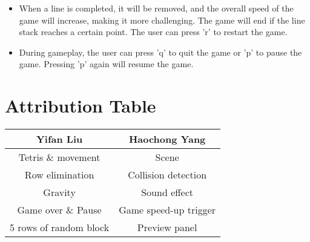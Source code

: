 \documentclass{article}
\begin{document}
\begin{enumerate}
\begin{itemize}
\item When a line is completed, it will be removed, and the overall speed of the game will increase, making it more challenging. The game will end if the line stack reaches a certain point. The user can press 'r' to restart the game.

\item During gameplay, the user can press 'q' to quit the game or 'p' to pause the game. Pressing 'p' again will resume the game.
\end{itemize}

    
\end{enumerate}

\section{Attribution Table}

\begin{center}
\begin{tabular}{|| c | c ||}
\hline
 Yifan Liu &  Haochong Yang \\ 
 \hline
 Tetris \& movement & Scene\\
 \hline
 Row elimination & Collision detection\\
 \hline
 Gravity & Sound effect \\ 
 \hline
 Game over \& Pause & Game speed-up trigger \\ 
 \hline
 5 rows of random block & Preview panel\\

 \hline
\end{tabular}
\end{center}

\end{document}
